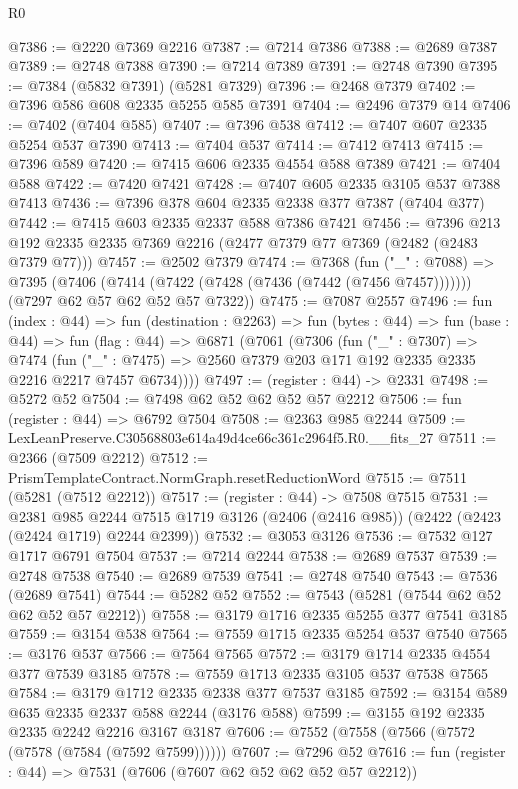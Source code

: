\begin{lexlean}{R0}
\begin{coremodule}
@7386 := @2220 @7369 @2216
@7387 := @7214 @7386
@7388 := @2689 @7387
@7389 := @2748 @7388
@7390 := @7214 @7389
@7391 := @2748 @7390
@7395 := @7384 (@5832 @7391) (@5281 @7329)
@7396 := @2468 @7379
@7402 := @7396 @586 @608 @2335 @5255 @585 @7391
@7404 := @2496 @7379 @14
@7406 := @7402 (@7404 @585)
@7407 := @7396 @538
@7412 := @7407 @607 @2335 @5254 @537 @7390
@7413 := @7404 @537
@7414 := @7412 @7413
@7415 := @7396 @589
@7420 := @7415 @606 @2335 @4554 @588 @7389
@7421 := @7404 @588
@7422 := @7420 @7421
@7428 := @7407 @605 @2335 @3105 @537 @7388 @7413
@7436 := @7396 @378 @604 @2335 @2338 @377 @7387 (@7404 @377)
@7442 := @7415 @603 @2335 @2337 @588 @7386 @7421
@7456 := @7396 @213 @192 @2335 @2335 @7369 @2216 (@2477 @7379 @77 @7369 (@2482 (@2483 @7379 @77)))
@7457 := @2502 @7379
@7474 := @7368
    (fun ("_" : @7088) =>
    @7395
      (@7406 (@7414 (@7422 (@7428 (@7436 (@7442 (@7456 @7457)))))))
      (@7297 @62 @57 @62 @52 @57 @7322))
@7475 := @7087 @2557
@7496 := fun (index : @44) =>
  fun (destination : @2263) =>
  fun (bytes : @44) =>
  fun (base : @44) =>
  fun (flag : @44) =>
  @6871
    (@7061
      (@7306
        (fun ("_" : @7307) =>
        @7474
          (fun ("_" : @7475) => @2560 @7379 @203 @171 @192 @2335 @2335 @2216 @2217 @7457 @6734))))
@7497 := (register : @44) -> @2331
@7498 := @5272 @52
@7504 := @7498 @62 @52 @62 @52 @57 @2212
@7506 := fun (register : @44) => @6792 @7504
@7508 := @2363 @985 @2244
@7509 := LexLeanPreserve.C30568803e614a49d4ce66c361c2964f5.R0.__fits_27
@7511 := @2366 (@7509 @2212)
@7512 := PrismTemplateContract.NormGraph.resetReductionWord
@7515 := @7511 (@5281 (@7512 @2212))
@7517 := (register : @44) -> @7508 @7515
@7531 := @2381
    @985
    @2244
    @7515
    @1719
    @3126
    (@2406 (@2416 @985))
    (@2422 (@2423 (@2424 @1719) @2244 @2399))
@7532 := @3053 @3126
@7536 := @7532 @127 @1717 @6791 @7504
@7537 := @7214 @2244
@7538 := @2689 @7537
@7539 := @2748 @7538
@7540 := @2689 @7539
@7541 := @2748 @7540
@7543 := @7536 (@2689 @7541)
@7544 := @5282 @52
@7552 := @7543 (@5281 (@7544 @62 @52 @62 @52 @57 @2212))
@7558 := @3179 @1716 @2335 @5255 @377 @7541 @3185
@7559 := @3154 @538
@7564 := @7559 @1715 @2335 @5254 @537 @7540
@7565 := @3176 @537
@7566 := @7564 @7565
@7572 := @3179 @1714 @2335 @4554 @377 @7539 @3185
@7578 := @7559 @1713 @2335 @3105 @537 @7538 @7565
@7584 := @3179 @1712 @2335 @2338 @377 @7537 @3185
@7592 := @3154 @589 @635 @2335 @2337 @588 @2244 (@3176 @588)
@7599 := @3155 @192 @2335 @2335 @2242 @2216 @3167 @3187
@7606 := @7552 (@7558 (@7566 (@7572 (@7578 (@7584 (@7592 @7599))))))
@7607 := @7296 @52
@7616 := fun (register : @44) => @7531 (@7606 (@7607 @62 @52 @62 @52 @57 @2212))

\end{coremodule}
\end{lexlean}

